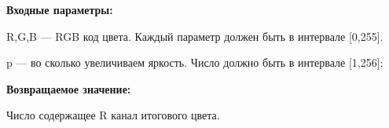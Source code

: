 \textbf{Входные параметры:}  

R,G,B --- RGB код цвета. Каждый параметр должен быть в интервале [0,255].

p --- во сколько увеличиваем яркость. Число должно быть в интервале [1,256];

\textbf{Возвращаемое значение:}

Число содержащее R канал итогового цвета.